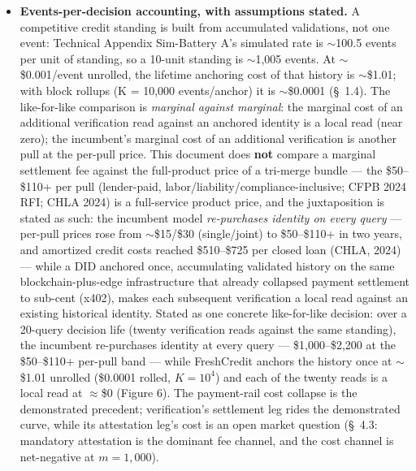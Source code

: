 \documentclass[11pt,twocolumn]{article}
\begin{document}
\begin{itemize}
\item \textbf{Events-per-decision accounting, with assumptions stated.} A competitive credit standing is built from accumulated validations, not one event: Technical Appendix Sim-Battery A's simulated rate is $\sim$100.5 events per unit of standing, so a 10-unit standing is $\sim$1,005 events. At $\sim$\$0.001/event unrolled, the lifetime anchoring cost of that history is $\sim$\$1.01; with block rollups (K = 10,000 events/anchor) it is $\sim$\$0.0001 (\S~1.4). The like-for-like comparison is \emph{marginal against marginal}: the marginal cost of an additional verification read against an anchored identity is a local read (near zero); the incumbent's marginal cost of an additional verification is another pull at the per-pull price. This document does \textbf{not} compare a marginal settlement fee against the full-product price of a tri-merge bundle --- the \$50--\$110+ per pull (lender-paid, labor/liability/compliance-inclusive; CFPB 2024 RFI; CHLA 2024) is a full-service product price, and the juxtaposition is stated as such: the incumbent model \emph{re-purchases identity on every query} --- per-pull prices rose from $\sim$\$15/\$30 (single/joint) to \$50--\$110+ in two years, and amortized credit costs reached \$510--\$725 per closed loan (CHLA, 2024) --- while a DID anchored once, accumulating validated history on the same blockchain-plus-edge infrastructure that already collapsed payment settlement to sub-cent (x402), makes each subsequent verification a local read against an existing historical identity. Stated as one concrete like-for-like decision: over a 20-query decision life (twenty verification reads against the same standing), the incumbent re-purchases identity at every query --- \$1,000--\$2,200 at the \$50--\$110+ per-pull band --- while FreshCredit anchors the history once at $\sim$\$1.01 unrolled (\$0.0001 rolled, $K = 10^{4}$) and each of the twenty reads is a local read at $\approx$\$0 (Figure 6). The payment-rail cost collapse is the demonstrated precedent; verification's settlement leg rides the demonstrated curve, while its attestation leg's cost is an open market question (\S~4.3: mandatory attestation is the dominant fee channel, and the cost channel is net-negative at $m = 1{,}000$).

\end{itemize}
\end{document}
